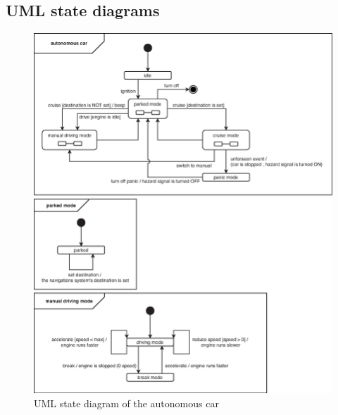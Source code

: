 \documentclass[12pt]{article}
\begin{document}
\begin{spacing}{1.5}
\newpage
\section{UML state diagrams}

\begin{figure}[h!]
	\centering
		\includegraphics[width=1\textwidth]{./figures/eps/EFSM.eps}
		  \caption{UML state diagram of the autonomous car}
  \label{fig:state-diagram}
\end{figure}
\begin{figure}[h!]
	\centering

\end{figure}
\end{spacing}
\end{document}
